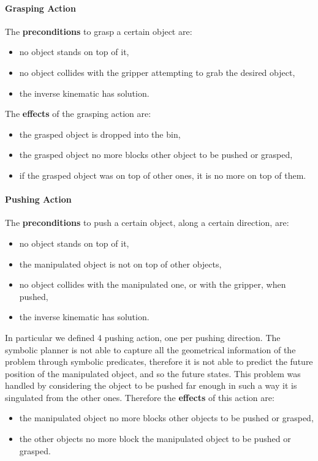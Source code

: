 \paragraph{Grasping Action}
The \textbf{preconditions} to grasp a certain object are:
\begin{itemize}
\item no object stands on top of it,
\item no object collides with the gripper attempting to grab the desired object,
\item the inverse kinematic has solution.
\end{itemize}
The \textbf{effects} of the grasping action are:
\begin{itemize}
\item the grasped object is dropped into the bin,
\item the grasped object no more blocks other object to be pushed or grasped,
\item if the grasped object was on top of other ones, it is no more on top of them.
\end{itemize}  

\paragraph{Pushing Action}
The \textbf{preconditions} to push a certain object, along a certain direction, are:
\begin{itemize}
\item no object stands on top of it,
\item the manipulated object is not on top of other objects,
\item no object collides with the manipulated one, or with the gripper, when pushed,
\item the inverse kinematic has solution.
\end{itemize}
In particular we defined 4 pushing action, one per pushing direction. 
The symbolic planner is not able to capture all the geometrical information of the problem through symbolic predicates, therefore it is not able to predict the future position of the manipulated object, and so the future states. This problem was handled by considering the object to be pushed far enough in such a way it is singulated from the other ones.  
Therefore the \textbf{effects} of this action are:
\begin{itemize}
\item the manipulated object no more blocks other objects to be pushed or grasped,
\item the other objects no more block the manipulated object to be pushed or grasped.
\end{itemize}  

